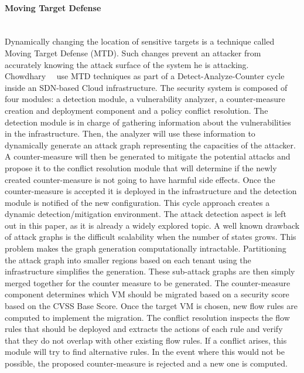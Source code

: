 \paragraph{Moving Target Defense}\textbf{\\}
Dynamically changing the location of sensitive targets is a technique called Moving Target Defense (MTD). Such changes prevent an attacker from accurately knowing the attack surface of the system he is attacking. 
Chowdhary~\etal~\cite{Chowdhary2016} use MTD techniques as part of a Detect-Analyze-Counter cycle inside an SDN-based Cloud infrastructure. 
The security system is composed of four modules: a detection module, a vulnerability analyzer, a counter-measure creation and deployment component and a policy conflict resolution.
The detection module is in charge of gathering information about the vulnerabilities in the infrastructure.
Then, the analyzer will use these information to dynamically generate an attack graph representing the capacities of the attacker. 
A counter-measure will then be generated to mitigate the potential attacks and propose it to the conflict resolution module that will determine if the newly created counter-measure is not going to have harmful side effects. Once the counter-measure is accepted it is deployed in the infrastructure and the detection module is notified of the new configuration. This cycle approach creates a dynamic detection/mitigation environment.
The attack detection aspect is left out in this paper, as it is already a widely explored topic.
A well known drawback of attack graphs is the difficult scalability when the number of states grows.
This problem makes the graph generation computationally intractable. Partitioning the attack graph into smaller regions based on each tenant using the infrastructure simplifies the generation.
These sub-attack graphs are then simply merged together for the counter measure to be generated.
The counter-measure component determines which VM should be migrated based on a security score based on the CVSS Base Score.
Once the target VM is chosen, new flow rules are computed to implement the migration. 
The conflict resolution inspects the flow rules that should be deployed and extracts the actions of each rule and verify that they do not overlap with other existing flow rules. If a conflict arises, this module will try to find alternative rules. In the event where this would not be possible, the proposed counter-measure is rejected and a new one is computed.

